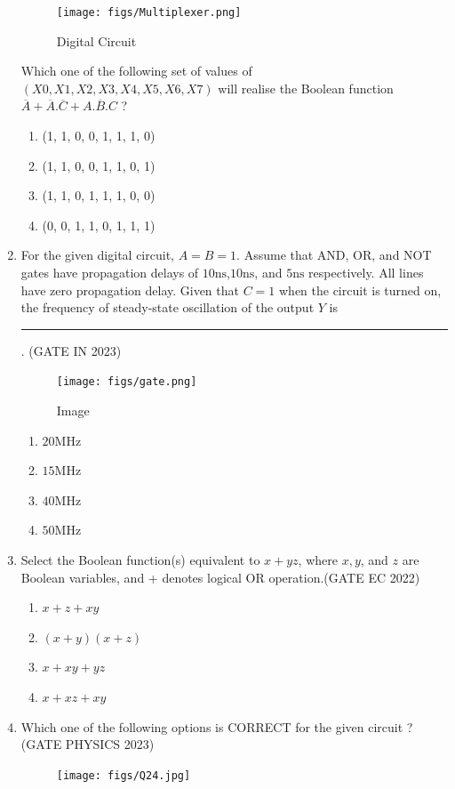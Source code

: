 \begin{enumerate}
\begin{figure}[H]
    \centering
        \texttt{[image: figs/Multiplexer.png]}
    \caption{Digital Circuit}
    \label{fig:Multiplexer}
\end{figure}

Which one of the following set of values of $(X0, X1, X2, X3, X4, X5, X6, X7)$ will realise the Boolean function 
$\overline{A} + \overline{A}.\overline{C}+A.\overline{B}.C $ ?
 \begin{enumerate}
     \item (1, 1, 0, 0, 1, 1, 1, 0)
     \item (1, 1, 0, 0, 1, 1, 0, 1)
     \item (1, 1, 0, 1, 1, 1, 0, 0)
     \item (0, 0, 1, 1, 0, 1, 1, 1)
 \end{enumerate}
\item For the given digital circuit, $A = B = 1$. Assume that AND, OR, and NOT gates have propagation delays of $10\mathrm{ns}$,$10\mathrm{ns}$, and $5\mathrm{ns}$ respectively. All lines have zero
propagation delay. Given that $C = 1$ when the circuit is turned on, the frequency of steady-state oscillation of the output $Y$  is  \rule{30pt}{1pt}.
\hfill (GATE IN 2023)
\begin{figure}[!h]
        \centering  
        
        \texttt{[image: figs/gate.png]}
        \caption{Image}
	\label{fig:Image}
        
\end{figure}
    \begin{enumerate}
        \item $20 \mathrm{MHz}$
        \item $15 \mathrm{MHz}$
        \item $40 \mathrm{MHz}$
        \item $50 \mathrm{MHz}$
    \end{enumerate}
\item Select the Boolean function(s) equivalent to $x + yz$, where $x,y$, and $z$ are Boolean variables, and + denotes logical OR  operation.\hfill(GATE EC 2022)
	\begin{enumerate}[label=(\Alph*)]
		\item $x + z + {xy}$
		\item ${(x + y)}{(x + z)}$
		\item $x + {xy} + {yz}$
		\item $x + {xz} + {xy}$
	\end{enumerate}
 \item Which one of the following options is CORRECT for the given circuit ?\hfill(GATE PHYSICS 2023)
		\begin{figure}[h]
			\centering
			\texttt{[image: figs/Q24.jpg]}
			\caption{}
			\label{figure:xxxx}
		\end{figure}


\end{enumerate}

